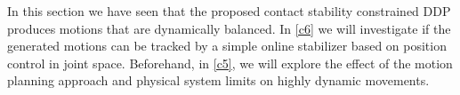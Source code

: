 In this section we have seen that the proposed contact stability constrained DDP produces motions that are dynamically balanced. In \cref{c6} we will investigate if the generated motions can be tracked by a simple online stabilizer based on position control in joint space. Beforehand, in \cref{c5}, we will explore the effect of the motion planning approach and physical system limits on highly dynamic movements.
























